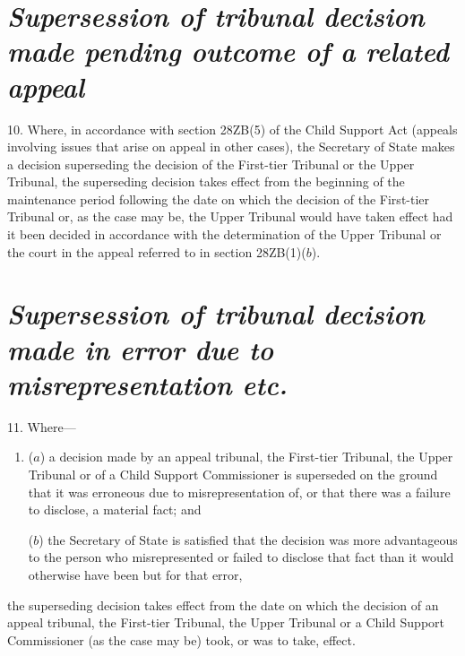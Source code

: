 \documentclass[12pt,a4paper]{article}
\begin{document}
\section*{\itshape\sloppy{} Supersession of tribunal decision made pending outcome of a related appeal}

10.  Where, in accordance with section 28ZB(5) of the Child Support Act (appeals involving issues that arise on appeal in other cases), the 
Secretary of State  %
makes a decision superseding the decision of the First-tier Tribunal or the Upper Tribunal, the superseding decision takes effect from the beginning of the maintenance period following the date on which the decision of the First-tier Tribunal or, as the case may be, the Upper Tribunal would have taken effect had it been decided in accordance with the determination of the Upper Tribunal or the court in the appeal referred to in section 28ZB(1)($b$).


\section*{\itshape\sloppy{}  Supersession of tribunal decision made in error due to misrepresentation etc.}

11.  Where—
\begin{enumerate}\item[]
($a$) a decision made by 
an appeal tribunal, the First-tier Tribunal, the Upper Tribunal or of a Child Support Commissioner  %
is superseded on the ground that it was erroneous due to misrepresentation of, or that there was a failure to disclose, a material fact; and

($b$) the 
Secretary of State  %
is satisfied that the decision was more advantageous to the person who misrepresented or failed to disclose that fact than it would otherwise have been but for that error,
\end{enumerate}
the superseding decision takes effect from the date on which the decision of 
an appeal tribunal, the First-tier Tribunal, the Upper Tribunal or a Child Support Commissioner (as the case may be)  %
took, or was to take, effect.
\end{document}

